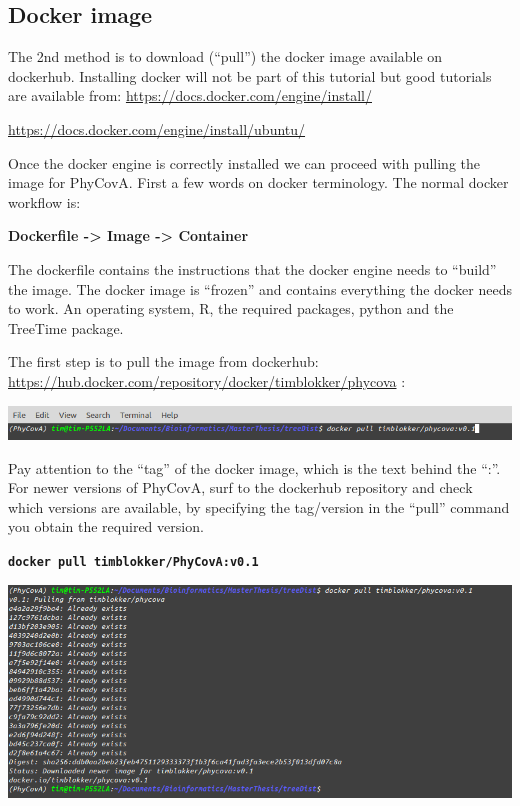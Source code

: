 \documentclass[
]{article}
\begin{document}
\hypertarget{docker-image}{%
\subsection{Docker image}\label{docker-image}}

The 2nd method is to download (``pull'') the docker image available on
dockerhub. Installing docker will not be part of this tutorial but good
tutorials are available from:
\url{https://docs.docker.com/engine/install/}

\url{https://docs.docker.com/engine/install/ubuntu/}

Once the docker engine is correctly installed we can proceed with
pulling the image for PhyCovA. First a few words on docker terminology.
The normal docker workflow is:

\textbf{Dockerfile -\textgreater{} Image -\textgreater{} Container}

The dockerfile contains the instructions that the docker engine needs to
``build'' the image. The docker image is ``frozen'' and contains
everything the docker needs to work. An operating system, R, the
required packages, python and the TreeTime package.

The first step is to pull the image from dockerhub:
\url{https://hub.docker.com/repository/docker/timblokker/phycova} :

\includegraphics{tutorial_img/Pull_Docker.png}

Pay attention to the ``tag'' of the docker image, which is the text
behind the ``:''. For newer versions of PhyCovA, surf to the dockerhub
repository and check which versions are available, by specifying the
tag/version in the ``pull'' command you obtain the required version.

\textbf{\texttt{docker\ pull\ timblokker/PhyCovA:v0.1}}

\includegraphics{tutorial_img/Pulled_Docker.png}
\end{document}
